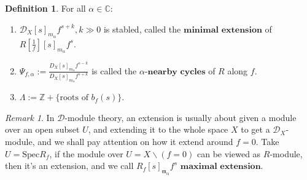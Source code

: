 \documentclass[openany]{book}
\theoremstyle{definition} %
\newtheorem{definition}[theorem]{Definition} %
\theoremstyle{remark}
\newtheorem{remark}{Remark}[chapter] %
\begin{document}
\begin{definition}
    For all $\alpha \in \mathbb{C}$:
    \begin{enumerate}
        \item $\mathcal{D}_X[s]_{m_\alpha} f^{s+k},  k \gg 0$ is stabled, called the $\textbf{minimal extension}$ of $R[\frac{1}{f}][s]_{m_\alpha} f^s$.
        \item $\Psi_{f,\alpha} := \frac{D_X[s]_{m_\alpha} f^{s-k}}{D_X[s]_{m_\alpha} f^{s+k}}$ is called the $\alpha\textbf{-nearby cycles}$ of $R$ along $f$.
        \item $\Lambda := \mathbb{Z} + \{\text{roots of } b_{f}(s)\}$.
    \end{enumerate}
\end{definition}

\begin{remark}
    In $\mathcal{D}$-module theory, an extension is usually about given a module over an open subset $U$, and extending it to the whole space $X$ to get a $\mathcal{D}_{X}$-module, and we shall pay attention on how it extend around $f=0$. Take $U=\mathrm{Spec}R_{f}$, if the module over $U=X\backslash(f=0)$ can be viewed as $R$-module, then it's an extension, and we call $R_{f}[s]_{\mathfrak{m}_{\alpha}}f^{s}$  $\textbf{maximal extension}$.
\end{remark}
\end{document}
